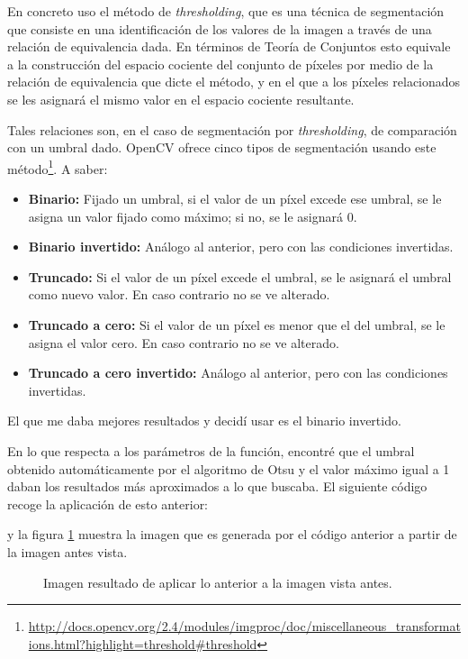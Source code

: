 \documentclass[a4paper,12pt]{article}
\begin{document}
En concreto uso el método de \textit{thresholding}, que es una técnica de segmentación que consiste en una identificación de los valores de la imagen a través de una relación de equivalencia dada. En términos de Teoría de Conjuntos esto equivale a la construcción del espacio cociente del conjunto de píxeles por medio de la relación de equivalencia que dicte el método, y en el que a los píxeles relacionados se les asignará el mismo valor en el espacio cociente resultante.

Tales relaciones son, en el caso de segmentación por \textit{thresholding}, de comparación con un umbral dado. OpenCV ofrece cinco tipos de segmentación usando este método\footnote{\url{http://docs.opencv.org/2.4/modules/imgproc/doc/miscellaneous_transformations.html?highlight=threshold#threshold}}. A saber:

\begin{itemize}
\item \textbf{Binario:} Fijado un umbral, si el valor de un píxel excede ese umbral, se le asigna un valor fijado como máximo; si no, se le asignará 0.
\item \textbf{Binario invertido:} Análogo al anterior, pero con las condiciones invertidas.
\item \textbf{Truncado:} Si el valor de un píxel excede el umbral, se le asignará el umbral como nuevo valor. En caso contrario no se ve alterado.
\item \textbf{Truncado a cero:} Si el valor de un píxel es menor que el del umbral, se le asigna el valor cero. En caso contrario no se ve alterado.
\item \textbf{Truncado a cero invertido:} Análogo al anterior, pero con las condiciones invertidas.
\end{itemize}

El que me daba mejores resultados y decidí usar es el binario invertido.

En lo que respecta a los parámetros de la función, encontré que el umbral obtenido automáticamente por el algoritmo de Otsu y el valor máximo igual a 1 daban los resultados más aproximados a lo que buscaba.
El siguiente código recoge la aplicación de esto anterior:

y la figura \ref{fig:img2} muestra la imagen que es generada por el código anterior a partir de la imagen antes vista.

\begin{figure}[h!]
\centering
{}
\caption{Imagen resultado de aplicar lo anterior a la imagen vista antes.}
\label{fig:img2}
\end{figure}
\end{document}
